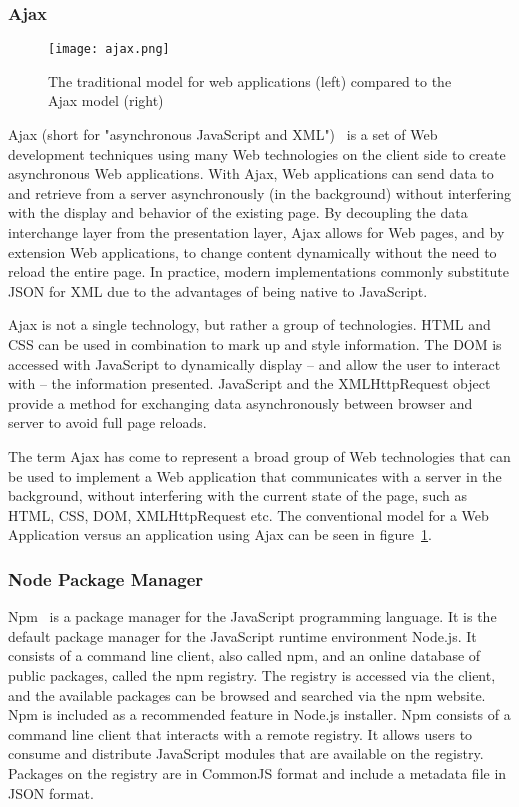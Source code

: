 \subsubsection{Ajax}
\label{ajax}
\begin{figure}
	\texttt{[image: ajax.png]}
	\caption{The traditional model for web applications (left) compared to the Ajax model (right)}
	\label{ajaxPNG}
\end{figure}
Ajax (short for "asynchronous JavaScript and XML")~\cite{garrett2005ajax} is a set of Web development techniques using many Web technologies on the client side to create asynchronous Web applications. With Ajax, Web applications can send data to and retrieve from a server asynchronously (in the background) without interfering with the display and behavior of the existing page. By decoupling the data interchange layer from the presentation layer, Ajax allows for Web pages, and by extension Web applications, to change content dynamically without the need to reload the entire page. In practice, modern implementations commonly substitute JSON for XML due to the advantages of being native to JavaScript.\par
Ajax is not a single technology, but rather a group of technologies. HTML and CSS can be used in combination to mark up and style information. The DOM is accessed with JavaScript to dynamically display – and allow the user to interact with – the information presented. JavaScript and the XMLHttpRequest object provide a method for exchanging data asynchronously between browser and server to avoid full page reloads.\par 
The term Ajax has come to represent a broad group of Web technologies that can be used to implement a Web application that communicates with a server in the background, without interfering with the current state of the page, such as HTML, CSS, DOM, XMLHttpRequest etc. The conventional model for a Web Application versus an application using Ajax can be seen in figure~\ref{ajaxPNG}.

\subsubsection{Node Package Manager}
Npm~\cite{schlueternode} is a package manager for the JavaScript programming language. It is the default package manager for the JavaScript runtime environment Node.js. It consists of a command line client, also called npm, and an online database of public packages, called the npm registry. The registry is accessed via the client, and the available packages can be browsed and searched via the npm website. Npm is included as a recommended feature in Node.js installer. Npm consists of a command line client that interacts with a remote registry. It allows users to consume and distribute JavaScript modules that are available on the registry. Packages on the registry are in CommonJS format and include a metadata file in JSON format.

